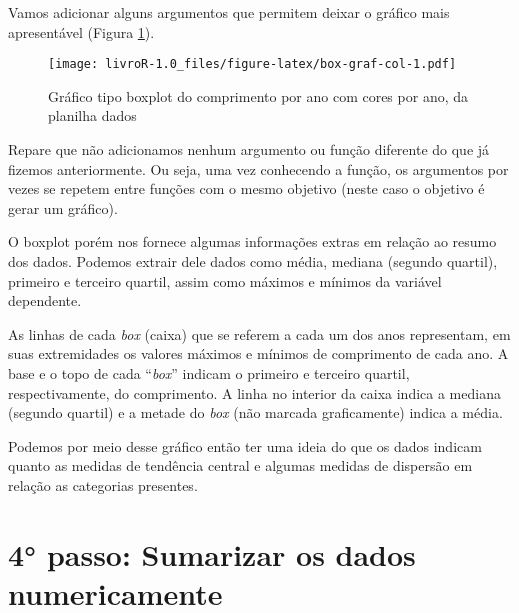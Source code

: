 \documentclass[titlepage, oneside, openany, a4paper]{book}
\newenvironment{Shaded}{\begin{snugshade}}{\end{snugshade}}
\newcommand{\DataTypeTok}[1]{\textcolor[rgb]{0.13,0.29,0.53}{#1}}
\newcommand{\KeywordTok}[1]{\textcolor[rgb]{0.13,0.29,0.53}{\textbf{#1}}}
\newcommand{\NormalTok}[1]{#1}
\newcommand{\OperatorTok}[1]{\textcolor[rgb]{0.81,0.36,0.00}{\textbf{#1}}}
\newcommand{\StringTok}[1]{\textcolor[rgb]{0.31,0.60,0.02}{#1}}
\begin{document}
Vamos adicionar alguns argumentos que permitem deixar o gráfico mais apresentável (Figura \ref{fig:box-graf-col}).

\begin{Shaded}
\end{Shaded}

\begin{figure}
\centering
\texttt{[image: livroR-1.0\_files/figure-latex/box-graf-col-1.pdf]}
\caption{\label{fig:box-graf-col}Gráfico tipo boxplot do comprimento por ano com cores por ano, da planilha dados}
\end{figure}

Repare que não adicionamos nenhum argumento ou função diferente do que já fizemos anteriormente. Ou seja, uma vez conhecendo a função, os argumentos por vezes se repetem entre funções com o mesmo objetivo (neste caso o objetivo é gerar um gráfico).

O boxplot porém nos fornece algumas informações extras em relação ao resumo dos dados. Podemos extrair dele dados como média, mediana (segundo quartil), primeiro e terceiro quartil, assim como máximos e mínimos da variável dependente.

As linhas de cada \emph{box} (caixa) que se referem a cada um dos anos representam, em suas extremidades os valores máximos e mínimos de comprimento de cada ano. A base e o topo de cada ``\emph{box}'' indicam o primeiro e terceiro quartil, respectivamente, do comprimento. A linha no interior da caixa indica a mediana (segundo quartil) e a metade do \emph{box} (não marcada graficamente) indica a média.

Podemos por meio desse gráfico então ter uma ideia do que os dados indicam quanto as medidas de tendência central e algumas medidas de dispersão em relação as categorias presentes.

\hypertarget{passo-sumarizar-os-dados-numericamente}{%
\section{4° passo: Sumarizar os dados numericamente}\label{passo-sumarizar-os-dados-numericamente}}
\end{document}

